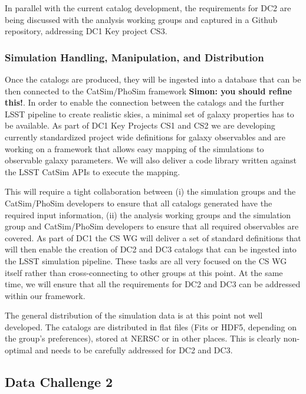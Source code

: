 In parallel with the current catalog development, the requirements for DC2 are being discussed with the analysis working groups and captured in a Github repository, addressing DC1 Key project CS3. 

\subsubsection{Simulation Handling, Manipulation, and Distribution}
\label{sec:keysims:dc1:handling}

Once the catalogs are produced, they will be ingested into a database that can be then connected to the CatSim/PhoSim framework {\bf Simon: you should refine this!}. In order to enable the connection between the catalogs and the further LSST pipeline to create realistic skies, a minimal set of galaxy properties has to be available. As part of DC1 Key Projects CS1 and CS2 we are developing currently standardized project wide definitions for galaxy observables and are working on a framework that allows easy mapping of the simulations to observable galaxy parameters. We will also deliver a code library written against the LSST CatSim APIs to execute the mapping.

This will require a tight collaboration between (i) the simulation groups and the CatSim/PhoSim developers to ensure that all catalogs generated have the required input information, (ii) the analysis working groups and the simulation group and CatSim/PhoSim developers to ensure that all required observables are covered. As part of DC1 the CS WG will deliver a set of standard definitions that will then enable the creation of DC2 and DC3 catalogs that can be ingested into the LSST simulation pipeline. These tasks are all very focused on the CS WG itself rather than cross-connecting to other groups at this point. At the same time, we will ensure that all the requirements for DC2 and DC3 can be addressed within our framework.

The general distribution of the simulation data is at this point not well developed. The catalogs are distributed in flat files (Fits or HDF5, depending on the group's preferences), stored at NERSC or in other places. This is clearly non-optimal and needs to be carefully addressed for DC2 and DC3.

\subsection{Data Challenge 2}
\label{sec:keysims:dc2}

